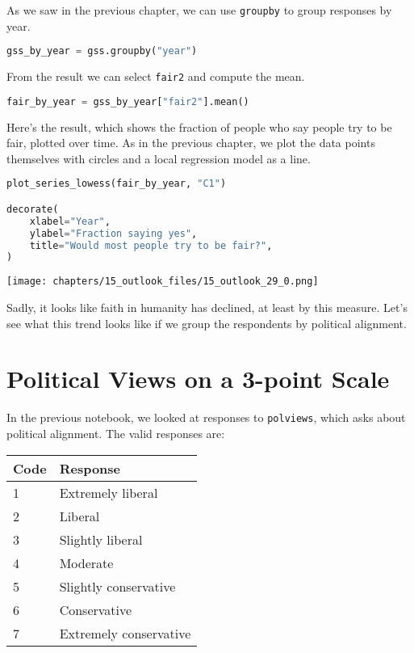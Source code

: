 As we saw in the previous chapter, we can use
\passthrough{\lstinline!groupby!} to group responses by year.

\begin{lstlisting}[language=Python,style=source]
gss_by_year = gss.groupby("year")
\end{lstlisting}

From the result we can select \passthrough{\lstinline!fair2!} and
compute the mean.

\begin{lstlisting}[language=Python,style=source]
fair_by_year = gss_by_year["fair2"].mean()
\end{lstlisting}

Here's the result, which shows the fraction of people who say people try
to be fair, plotted over time. As in the previous chapter, we plot the
data points themselves with circles and a local regression model as a
line.

\begin{lstlisting}[language=Python,style=source]
plot_series_lowess(fair_by_year, "C1")

decorate(
    xlabel="Year",
    ylabel="Fraction saying yes",
    title="Would most people try to be fair?",
)
\end{lstlisting}

\begin{center}
\texttt{[image: chapters/15\_outlook\_files/15\_outlook\_29\_0.png]}
\end{center}

Sadly, it looks like faith in humanity has declined, at least by this
measure. Let's see what this trend looks like if we group the
respondents by political alignment.

\hypertarget{political-views-on-a-3-point-scale}{%
\section{Political Views on a 3-point
Scale}\label{political-views-on-a-3-point-scale}}

In the previous notebook, we looked at responses to
\passthrough{\lstinline!polviews!}, which asks about political
alignment. The valid responses are:

\begin{longtable}[]{@{}ll@{}}
\midrule()
Code & Response \\
\midrule()
\endhead
1 & Extremely liberal \\
2 & Liberal \\
3 & Slightly liberal \\
4 & Moderate \\
5 & Slightly conservative \\
6 & Conservative \\
7 & Extremely conservative \\
\midrule()
\end{longtable}

